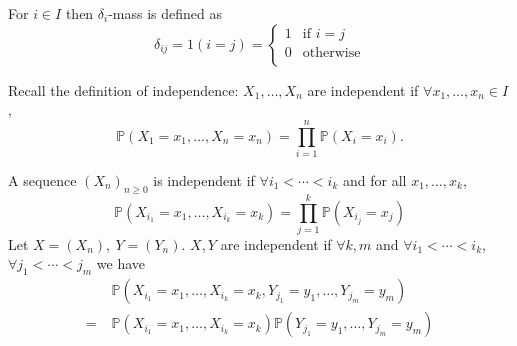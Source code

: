 \documentclass[a4paper,11pt]{article}
\begin{document}
\begin{definition}
    For $i\in I$ then $ \delta_i $-mass is defined as 
    \[
        \delta_{ij} = 1(i=j) = \begin{cases}
        1 &\text{if }i=j\\
        0 &\text{otherwise}\\
        \end{cases} 
    \]
\end{definition}
Recall the definition of independence: $ X_1,\dots,X_n $ are independent if $ \forall x_1,\dots,x_n\in I $, 
\[
    \mathbb{P}(X_1=x_1,\dots,X_n=x_n) = \prod_{i=1}^{n} \mathbb{P}(X_i=x_i).
\]
\begin{definition}
    A sequence $ (X_n)_{n\ge 0} $ is independent if $ \forall i_1<\cdots<i_k $ and for all $ x_1,\dots,x_k $, 
    \[
        \mathbb{P}(X_{i_1}=x_1,\dots,X_{i_k}=x_k) = \prod_{j=1}^{k}\mathbb{P}(X_{i_j}=x_j)
    \]
    Let $ X=(X_n),\ Y=(Y_n) $. $X,Y$ are independent if $ \forall k,m $ and $ \forall i_1<\cdots<i_k $, $ \forall j_1<\cdots<j_m $ we have 
    \begin{align*}
        &\mathbb{P}(X_{i_1}=x_1,\dots,X_{i_k}=x_k, Y_{j_1}=y_1,\dots,Y_{j_m}=y_m)\\
        =\;& \mathbb{P}(X_{i_1}=x_1,\dots,X_{i_k}=x_k) \mathbb{P}(Y_{j_1}=y_1,\dots,Y_{j_m}=y_m)
    \end{align*}
\end{definition}
\end{document}
